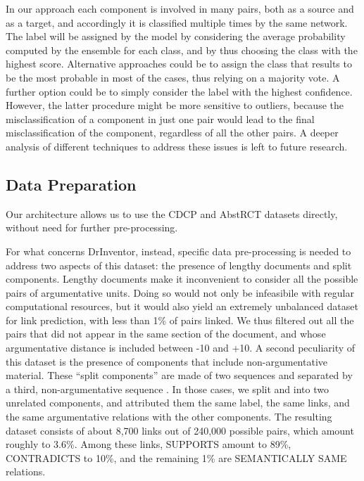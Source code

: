\documentclass[journal]{IEEEtran}
\begin{document}
In our approach each component is involved in many pairs, both as a source and as a target, and accordingly it is classified multiple times by the same network. The label will be assigned by the model by considering the average probability computed by the ensemble for each class, and by thus choosing the class with the highest score. Alternative approaches could be to assign the class that results to be the most probable in most of the cases, thus relying on a majority vote. A further option could be to simply consider the label with the highest confidence. However, the latter procedure might be more sensitive to outliers, because the misclassification of a component in just one pair would lead to the final misclassification of the component, regardless of all the other pairs. A deeper analysis of different techniques to address these issues is left to future research.


\subsection{Data Preparation}

Our architecture allows us to use the CDCP and AbstRCT datasets directly, without need for further pre-processing.

For what concerns DrInventor, instead, specific data pre-processing is needed to address two aspects of this dataset: the presence of lengthy documents and split components.
Lengthy documents make it inconvenient to consider all the possible pairs of argumentative units. Doing so would not only be infeasibile with regular computational resources, but it would also yield an extremely unbalanced dataset for link prediction, with less than 1\% of pairs linked. We thus filtered out all the pairs that did not appear in the same section of the document, and whose argumentative distance is included between -10 and +10.
A second peculiarity of this dataset is the presence of components that include non-argumentative material. These ``split components'' are made of two sequences  and  separated by a third, non-argumentative sequence .
In those cases, we split  and  into two unrelated components,
and attributed them  the same label, the same links, and the same argumentative relations with the other components.
The resulting dataset consists of about 8,700 links out of 240,000 possible pairs, which amount roughly to 3.6\%. Among these links, SUPPORTS amount to 89\%, CONTRADICTS to 10\%, and the remaining 1\% are SEMANTICALLY SAME relations.
\end{document}
